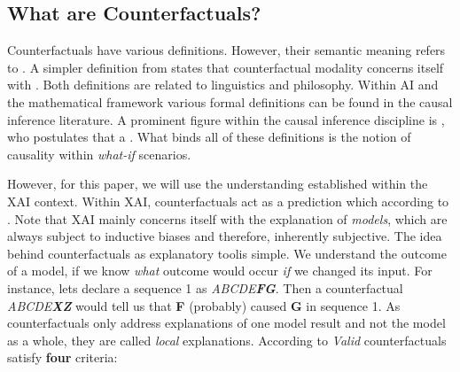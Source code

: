 \documentclass[./../../paper.tex]{subfiles}
\begin{document}
\subsection{What are Counterfactuals?}
Counterfactuals have various definitions. However, their semantic meaning refers to \autocite{_counterfactual_}. A simpler definition from \citeauthor{starr_Counterfactuals_2021} states that counterfactual modality concerns itself with .
Both definitions are related to linguistics and philosophy. Within AI and the mathematical framework various formal definitions can be found in the causal inference\autocite{hitchcock_CausalModels_2020} literature. A prominent figure within the causal inference discipline is \citeauthor{pearl_Causalinferencestatistics_2016}, who postulates that a \autocite{pearl_Causalinferencestatistics_2016}. What binds all of these definitions is the notion of causality within \emph{what-if} scenarios.

However, for this paper, we will use the understanding established within the \gls{XAI} context. Within \gls{XAI}, counterfactuals act as a prediction which  according to \citeauthor{molnar2019}\autocite[ch.9.3]{molnar2019}. Note that \gls{XAI} mainly concerns itself with the explanation of \emph{models}, which are always subject to inductive biases and therefore, inherently subjective. The idea behind counterfactuals as explanatory tool\footnotemark is simple. We understand the outcome of a model, if we know \emph{what} outcome would occur \emph{if} we changed its input. For instance, lets declare a sequence 1 as \textit{ABCDE\textbf{FG}}. Then a counterfactual \textit{ABCDE\textbf{XZ}} would tell us that \textbf{F} (probably) caused \textbf{G} in sequence 1. As counterfactuals only address explanations of one model result and not the model as a whole, they are called \emph{local} explanations\autocite[ch.9.3]{molnar2019}. According to \citeauthor{molnar2019} \emph{Valid} counterfactuals satisfy \textbf{four} criteria\autocite[ch.9.3]{molnar2019}:
\end{document}
